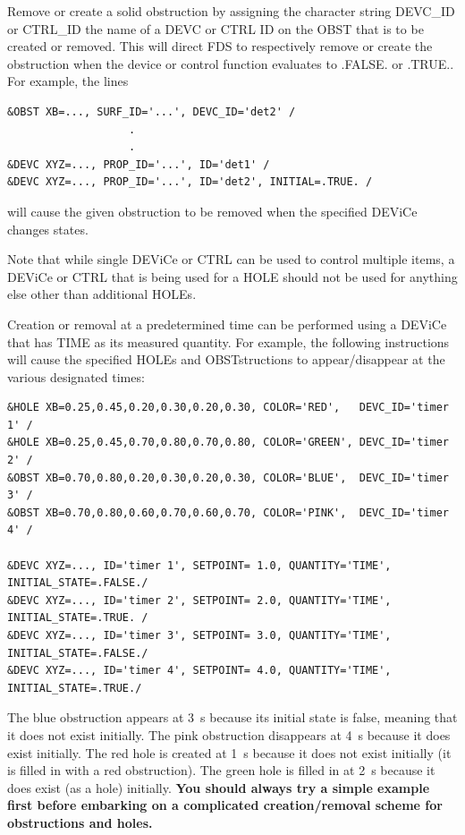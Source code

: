 \documentclass[11pt]{book}
\begin{document}
Remove or create a solid obstruction by assigning the character string {\ct DEVC\_ID} or {\ct CTRL\_ID} the name of
a {\ct DEVC} or {\ct CTRL} {\ct ID} on the {\ct OBST} that is to be created or removed.  This will direct
FDS to respectively remove or create the obstruction when
the device or control function evaluates to {\ct .FALSE.} or {\ct .TRUE.}. For example, the lines

\footnotesize
\begin{verbatim}
&OBST XB=..., SURF_ID='...', DEVC_ID='det2' /
                   .
                   .
&DEVC XYZ=..., PROP_ID='...', ID='det1' /
&DEVC XYZ=..., PROP_ID='...', ID='det2', INITIAL=.TRUE. /
\end{verbatim}
\normalsize

\noindent
will cause the given obstruction to be removed when the specified {\ct DEViCe} changes states.

\begin{warning}
\noindent
Note that while single {\ct DEViCe} or {\ct CTRL} can be used to control multiple items, a {\ct DEViCe} or {\ct CTRL}
that is being used for a {\ct HOLE} should not be used for anything else other than additional {\ct HOLE}s.
\end{warning}

Creation or removal at a predetermined time can be performed using a {\ct DEViCe} that has {\ct TIME} as
its measured quantity. For example, the following instructions will cause the specified {\ct HOLE}s and {\ct OBST}structions to
appear/disappear at the various designated times:

\footnotesize
\begin{verbatim}
&HOLE XB=0.25,0.45,0.20,0.30,0.20,0.30, COLOR='RED',   DEVC_ID='timer 1' /
&HOLE XB=0.25,0.45,0.70,0.80,0.70,0.80, COLOR='GREEN', DEVC_ID='timer 2' /
&OBST XB=0.70,0.80,0.20,0.30,0.20,0.30, COLOR='BLUE',  DEVC_ID='timer 3' /
&OBST XB=0.70,0.80,0.60,0.70,0.60,0.70, COLOR='PINK',  DEVC_ID='timer 4' /

&DEVC XYZ=..., ID='timer 1', SETPOINT= 1.0, QUANTITY='TIME', INITIAL_STATE=.FALSE./
&DEVC XYZ=..., ID='timer 2', SETPOINT= 2.0, QUANTITY='TIME', INITIAL_STATE=.TRUE. /
&DEVC XYZ=..., ID='timer 3', SETPOINT= 3.0, QUANTITY='TIME', INITIAL_STATE=.FALSE./
&DEVC XYZ=..., ID='timer 4', SETPOINT= 4.0, QUANTITY='TIME', INITIAL_STATE=.TRUE./
\end{verbatim}
\normalsize

\noindent
The blue obstruction appears at 3~s because its initial state is false, meaning that it does not exist initially. The pink
obstruction disappears at 4~s because it does exist initially. The red hole is created at 1~s because it does not exist initially (it is filled in with a
red obstruction). The green hole is filled in at 2~s because it does exist (as a hole) initially. {\bf You should always try a simple example first before
embarking on a complicated creation/removal scheme for obstructions and holes.}
\end{document}
